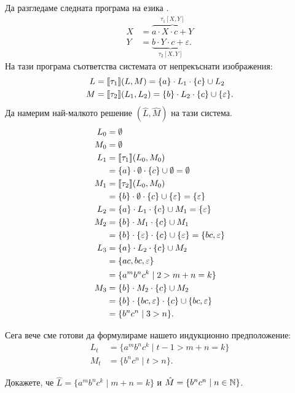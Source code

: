 \begin{example}
  Да разгледаме следната програма на езика \CFG.
  \begin{align*}
    X & = \overbrace{a\cdot X \cdot c + Y}^{\tau_1[X,Y]}\\
    Y & = \underbrace{b \cdot Y \cdot c + \varepsilon}_{\tau_2[X,Y]}.
  \end{align*}
  На тази програма съответства системата от непрекъснати изображения:
  \begin{align*}
    L & = \llbracket{\tau_1}\rrbracket(L,M) = \{a\}\cdot L_1 \cdot \{c\} \cup L_2\\
    M & = \llbracket{\tau_2}\rrbracket(L_1,L_2) = \{b\} \cdot L_2 \cdot \{c\} \cup \{\varepsilon\}.
  \end{align*}
  Да намерим най-малкото решение $(\hat{L},\hat{M})$ на тази система.
  \begin{align*}
    L_0 & = \emptyset\\
    M_0 & = \emptyset\\
    L_1 & = \llbracket{\tau_1}\rrbracket(L_0,M_0)\\
        & = \{a\}\cdot \emptyset \cdot \{c\} \cup \emptyset = \emptyset\\
    M_1 & = \llbracket{\tau_2}\rrbracket(L_0,M_0)\\
        & = \{b\} \cdot \emptyset \cdot \{c\} \cup \{\varepsilon\} = \{\varepsilon\}\\
    L_2 & = \{a\}\cdot L_1 \cdot \{c\} \cup M_1 = \{\varepsilon\}\\
    M_2 & = \{b\} \cdot M_1 \cdot \{c\} \cup M_1\\
        & = \{b\} \cdot \{\varepsilon\} \cdot \{c\} \cup \{\varepsilon\} = \{bc,\varepsilon\}\\
    L_3 & = \{a\}\cdot L_2 \cdot \{c\} \cup M_2 \\
        & = \{ac,bc,\varepsilon\}\\
        & = \{a^mb^nc^k \mid 2 > m+n = k\}\\
    M_3 & = \{b\} \cdot M_2 \cdot \{c\} \cup M_2\\
        & = \{b\} \cdot \{bc,\varepsilon\} \cdot \{c\} \cup \{bc,\varepsilon\}\\
        & = \{b^nc^n \mid 3 > n\}.
  \end{align*}

  Сега вече сме готови да формулираме нашето индукционно предположение:
  \begin{align*}
    L_t & = \{a^mb^nc^k \mid t-1 > m+n = k\}\\
    M_t & = \{b^nc^n \mid t > n \}.
  \end{align*}

  Докажете, че $\hat{L} = \{a^mb^nc^k \mid m+n = k\}$ и $\hat{M} = \{b^nc^n \mid n \in \mathbb{N}\}$.
  
\end{example}



